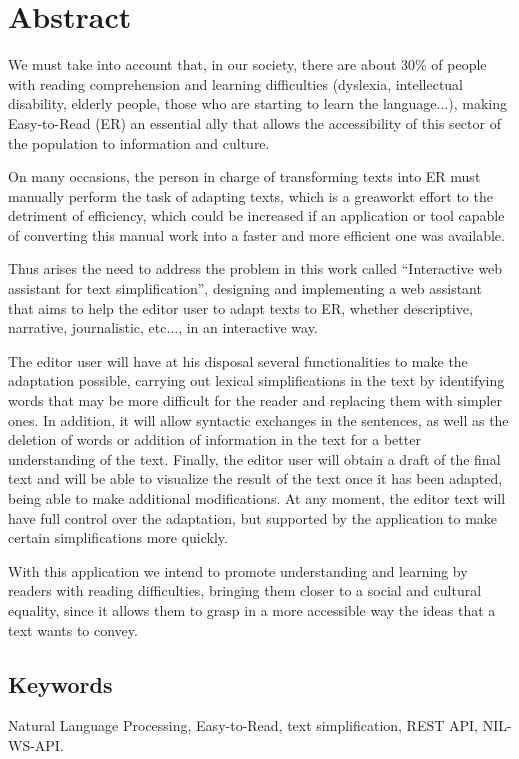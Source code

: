 \chapter*{Abstract}

We must take into account that, in our society, there are about 30\% of people with reading comprehension and learning difficulties (dyslexia, intellectual disability, elderly people, those who are starting to learn the language...), making Easy-to-Read (ER) an essential ally that allows the accessibility of this sector of the population to information and culture. 


On many occasions, the person in charge of transforming texts into ER must manually perform the task of adapting texts, which is a greaworkt effort to the detriment of efficiency, which could be increased if an application or tool capable of converting this manual work into a faster and more efficient one was available.


Thus arises the need to address the problem in this work called ``Interactive web assistant for text simplification'', designing and implementing a web assistant that aims to help the editor user to adapt texts to ER, whether descriptive, narrative, journalistic, etc..., in an interactive way. 


The editor user will have at his disposal several functionalities to make the adaptation possible, carrying out lexical simplifications in the text by identifying words that may be more difficult for the reader and replacing them with simpler ones. In addition, it will allow syntactic exchanges in the sentences, as well as the deletion of words or addition of information in the text for a better understanding of the text. Finally, the editor user will obtain a draft of the final text and will be able to visualize the result of the text once it has been adapted, being able to make additional modifications. At any moment, the editor text will have full control over the adaptation, but supported by the application to make certain simplifications more quickly.


With this application we intend to promote understanding and learning by readers with reading difficulties, bringing them closer to a social and cultural equality, since it allows them to grasp in a more accessible way the ideas that a text wants to convey.


\section*{Keywords}

\noindent Natural Language Processing, Easy-to-Read, text simplification, REST API, NIL-WS-API.
